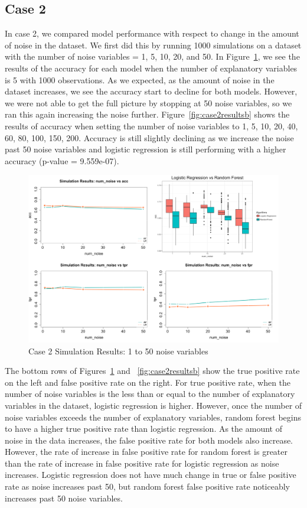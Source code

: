 \documentclass{llncs}
\begin{document}
\subsection{Case 2}
In case 2, we compared model performance with respect to change in the amount of noise in the dataset. We first did this by running 1000 simulations on a dataset with the number of noise variables = 1, 5, 10, 20, and 50.  In Figure~\ref{fig:case2results}, we see the results of the accuracy for each model when the number of explanatory variables is 5 with 1000 observations.  As we expected, as the amount of noise in the dataset increases, we see the accuracy start to decline for both models. However, we were not able to get the full picture by stopping at 50 noise variables, so we ran this again increasing the noise further.  Figure~\ref{fig:case2resultsb} shows the results of accuracy when setting the number of noise variables to 1, 5, 10, 20, 40, 60, 80, 100, 150, 200.  Accuracy is still slightly declining as we increase the noise past 50 noise variables and logistic regression is still performing with a higher accuracy (p-value = 9.559e-07).

\begin{figure}
\centering
\includegraphics[scale=0.55]{case2.png}
\caption{Case 2 Simulation Results: 1 to 50 noise variables}
\label{fig:case2results}
\end{figure}

The bottom rows of Figures~\ref{fig:case2results} and ~\ref{fig:case2resultsb} show the true positive rate on the left and false positive rate on the right.  For true positive rate, when the number of noise variables is the less than or equal to the number of explanatory variables in the dataset, logistic regression is higher.  However, once the number of noise variables exceeds the number of explanatory variables, random forest begins to have a higher true positive rate than logistic regression.  As the amount of noise in the data increases, the false positive rate for both models also increase.  However, the rate of increase in false positive rate for random forest is greater than the rate of increase in false positive rate for logistic regression as noise increases.  Logistic regression does not have much change in true or false positive rate as noise increases past 50, but random forest false positive rate noticeably increases past 50 noise variables.
\end{document}
